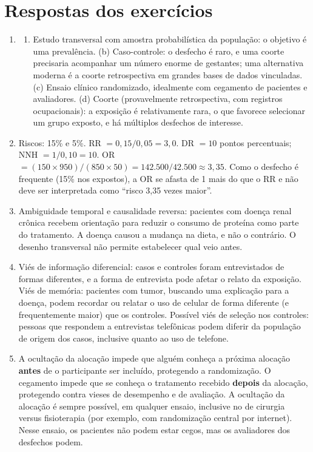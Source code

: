 \documentclass[
]{book}
\providecommand{\tightlist}{%
  \setlength{\itemsep}{0pt}\setlength{\parskip}{0pt}}
\begin{document}
\section{Respostas dos exercícios}\label{respostas-dos-exercuxedcios-2}

\begin{enumerate}
\def\labelenumi{\arabic{enumi}.}
\item
  \begin{enumerate}
  \def\labelenumii{(\alph{enumii})}
  \tightlist
  \item
    Estudo transversal com amostra probabilística da população: o objetivo é uma prevalência. (b) Caso-controle: o desfecho é raro, e uma coorte precisaria acompanhar um número enorme de gestantes; uma alternativa moderna é a coorte retrospectiva em grandes bases de dados vinculadas. (c) Ensaio clínico randomizado, idealmente com cegamento de pacientes e avaliadores. (d) Coorte (provavelmente retrospectiva, com registros ocupacionais): a exposição é relativamente rara, o que favorece selecionar um grupo exposto, e há múltiplos desfechos de interesse.
  \end{enumerate}
\item
  Riscos: 15\% e 5\%. RR \(= 0{,}15/0{,}05 = 3{,}0\). DR \(= 10\) pontos percentuais; NNH \(= 1/0{,}10 = 10\). OR \(= (150 \times 950)/(850 \times 50) = 142.500/42.500 \approx 3{,}35\). Como o desfecho é frequente (15\% nos expostos), a OR se afasta de 1 mais do que o RR e não deve ser interpretada como ``risco 3,35 vezes maior''.
\item
  Ambiguidade temporal e causalidade reversa: pacientes com doença renal crônica recebem orientação para reduzir o consumo de proteína como parte do tratamento. A doença causou a mudança na dieta, e não o contrário. O desenho transversal não permite estabelecer qual veio antes.
\item
  Viés de informação diferencial: casos e controles foram entrevistados de formas diferentes, e a forma de entrevista pode afetar o relato da exposição. Viés de memória: pacientes com tumor, buscando uma explicação para a doença, podem recordar ou relatar o uso de celular de forma diferente (e frequentemente maior) que os controles. Possível viés de seleção nos controles: pessoas que respondem a entrevistas telefônicas podem diferir da população de origem dos casos, inclusive quanto ao uso de telefone.
\item
  A ocultação da alocação impede que alguém conheça a próxima alocação \textbf{antes} de o participante ser incluído, protegendo a randomização. O cegamento impede que se conheça o tratamento recebido \textbf{depois} da alocação, protegendo contra vieses de desempenho e de avaliação. A ocultação da alocação é sempre possível, em qualquer ensaio, inclusive no de cirurgia versus fisioterapia (por exemplo, com randomização central por internet). Nesse ensaio, os pacientes não podem estar cegos, mas os avaliadores dos desfechos podem.

\end{enumerate}
\end{document}
